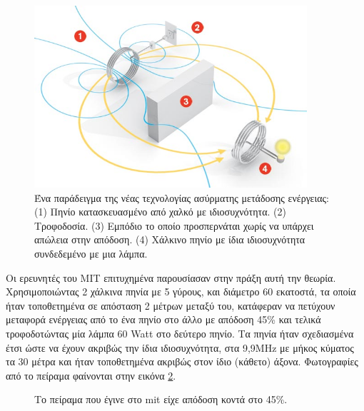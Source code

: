 \begin{figure}[h]
	\centering
	\includegraphics[width=0.9\textwidth]{images/mit_exper0.jpg}
	\caption{Ένα παράδειγμα της νέας τεχνολογίας ασύρματης μετάδοσης ενέργειας: (1) Πηνίο κατασκευασμένο από χαλκό με ιδιοσυχνότητα.
    (2) Τροφοδοσία. (3) Εμπόδιο το οποίο προσπερνάται χωρίς να υπάρχει απώλεια στην απόδοση. (4) Χάλκινο πηνίο με ίδια ιδιοσυχνότητα συνδεδεμένο με μια λάμπα.}
	\label{fig:mit_exper0}
\end{figure}


Οι ερευνητές του MIT επιτυχημένα παρουσίασαν στην πράξη αυτή την θεωρία. Χρησιμοποιώντας 2 χάλκινα πηνία με 5 γύρους, και διάμετρο 60 εκατοστά, τα οποία ήταν
τοποθετημένα σε απόσταση 2 μέτρων μεταξύ του, κατάφεραν να πετύχουν μεταφορά ενέργειας από το ένα πηνίο στο άλλο με απόδοση 45\% και τελικά τροφοδοτώντας μία λάμπα
60 Watt στο δεύτερο πηνίο. Τα πηνία ήταν σχεδιασμένα έτσι ώστε να έχουν ακριβώς την ίδια ιδιοσυχνότητα, στα 9,9MHz με μήκος κύματος τα 30 μέτρα και ήταν τοποθετημένα
ακριβώς στον ίδιο (κάθετο) άξονα. Φωτογραφίες από το πείραμα φαίνονται στην εικόνα \ref{fig:mit_eperiments}.
\begin{figure}[h]
  \centering
  \caption{Το πείραμα που έγινε στο mit είχε απόδοση κοντά στο 45\%.}
  \label{fig:mit_eperiments}
\end{figure}


